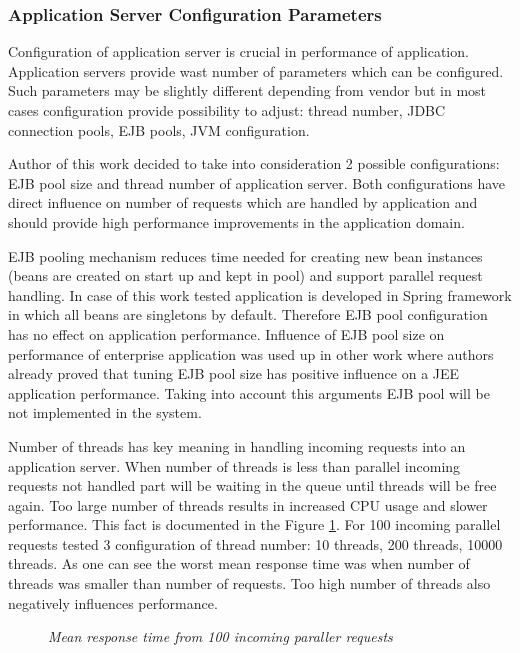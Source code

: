 \documentclass[10pt,a4paper]{article}
\begin{document}
\subsubsection{Application Server Configuration Parameters}

Configuration of application server is crucial in performance of application. Application servers provide wast number of parameters which can be configured. Such parameters may be slightly different depending from vendor but in most cases configuration provide possibility to adjust: thread number, JDBC connection pools, EJB pools, JVM configuration. 

Author of this work decided to take into consideration 2 possible configurations: EJB pool size and thread number of application server. Both configurations have direct influence on number of requests which are handled by application and should provide high performance improvements in the application domain. 

EJB pooling mechanism reduces time needed for creating new bean instances (beans are created on start up and kept in pool) and support parallel request handling. In case of this work tested application is developed in Spring framework in which all beans are singletons by default. Therefore EJB pool configuration has no effect on application performance. Influence of EJB pool size on performance of enterprise application was used up in other work \cite{autotuning} where authors already proved that tuning EJB pool size has positive influence on a JEE application performance. Taking into account this arguments EJB pool will be not implemented in the system. 

Number of threads has key meaning in handling incoming requests into an application server. When number of threads is less than parallel incoming requests not handled part will be waiting in the queue until threads will be free again. Too large number of threads results in increased CPU usage and slower performance. This fact is documented in the Figure \ref{fig:threads}. For 100 incoming parallel requests tested 3 configuration of thread number: 10 threads, 200 threads, 10000 threads. As one can see the worst mean response time was when number of threads was smaller than number of requests. Too high number of threads also negatively influences performance.   

\begin{figure}[!htb]
\centering
{}
\caption{\textit{Mean response time from 100 incoming paraller requests}} \label{fig:threads}
\end{figure}
\end{document}
